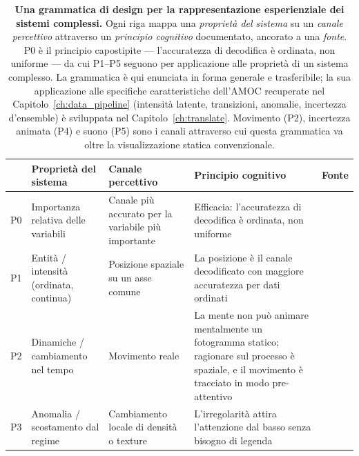 \begin{table}[!ht]
    \centering
    \small
    \caption[Una grammatica di design per la rappresentazione esperienziale dei sistemi complessi.]{\textbf{Una grammatica di design per la rappresentazione esperienziale dei sistemi complessi.}
             Ogni riga mappa una \emph{proprietà del sistema} su un \emph{canale percettivo} attraverso un
             \emph{principio cognitivo} documentato, ancorato a una \emph{fonte}. P0 è il principio
             capostipite --- l'accuratezza di decodifica è ordinata, non uniforme --- da cui P1--P5 seguono
             per applicazione alle proprietà di un sistema complesso. La grammatica è qui enunciata in
             forma generale e trasferibile; la sua applicazione alle specifiche caratteristiche dell'AMOC
             recuperate nel Capitolo~\ref{ch:data_pipeline} (intensità latente, transizioni, anomalie,
             incertezza d'ensemble) è sviluppata nel Capitolo~\ref{ch:translate}. Movimento (P2),
             incertezza animata (P4) e suono (P5) sono i canali attraverso cui questa
             grammatica va oltre la visualizzazione statica convenzionale.}
    \label{tab:design-grammar}
    \begin{tabular}{@{}p{0.5cm}p{2.5cm}p{2.9cm}p{3.3cm}p{2.3cm}@{}}
        \toprule
        & \textbf{Proprietà del sistema} & \textbf{Canale percettivo} & \textbf{Principio cognitivo} & \textbf{Fonte} \\
        \midrule
        P0 & Importanza relativa delle variabili
           & Canale più accurato per la variabile più importante
           & Efficacia: l'accuratezza di decodifica è ordinata, non uniforme
           & \citet{bertin1983, clevelandmcgill1984, munzner2014} \\[0.4em]
        P1 & Entità / intensità (ordinata, continua)
           & Posizione spaziale su un asse comune
           & La posizione è il canale decodificato con maggiore accuratezza per dati ordinati
           & \citet{clevelandmcgill1984, munzner2014} \\[0.4em]
        P2 & Dinamiche / cambiamento nel tempo
           & Movimento reale
           & La mente non può animare mentalmente un fotogramma statico; ragionare sul processo è spaziale, e il movimento è tracciato in modo pre-attentivo
           & \citet{sterman2008, cronin2009, tversky2019, ware2021} \\[0.4em]
        P3 & Anomalia / scostamento dal regime
           & Cambiamento locale di densità o texture
           & L'irregolarità attira l'attenzione dal basso senza bisogno di legenda

\end{tabular}
\end{table}
